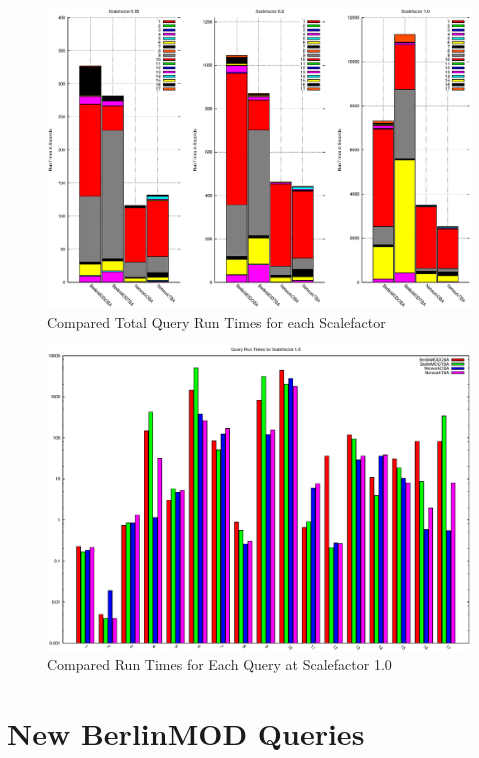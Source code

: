 \documentclass[a4paper]{article}
\begin{document}
\begin{figure}
\begin{center}
	\includegraphics[width=17.0cm]{compruntimesall.eps}
	\caption{Compared Total Query Run Times for each Scalefactor}
	\label{fig:compruntimesall}
\end{center}
\end{figure}
\begin{figure}
\begin{center}
   \includegraphics[width=17.0cm]{compqueryruntimes.eps}
   \caption{Compared Run Times for Each Query at Scalefactor 1.0}
   \label{fig:compqueryruntimesall}
\end{center}
\end{figure}
\section{New BerlinMOD Queries}
\label{sec:newqueries}
\end{document}
